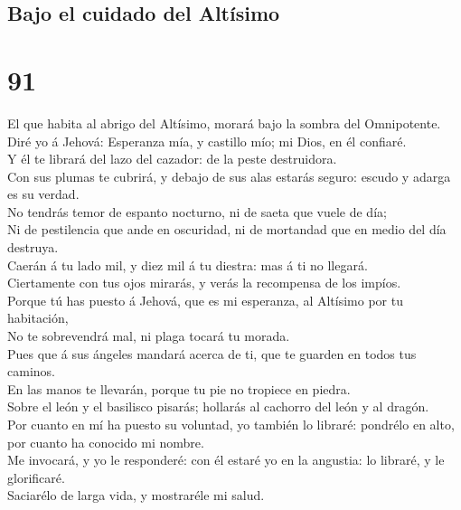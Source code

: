 \hypertarget{bajo-el-cuidado-del-altuxedsimo}{%
\subsection{Bajo el cuidado del
Altísimo}\label{bajo-el-cuidado-del-altuxedsimo}}

\hypertarget{section-90}{%
\section{91}\label{section-90}}

 El que habita al abrigo del Altísimo, morará bajo la
sombra del Omnipotente.\\
 Diré yo á Jehová: Esperanza mía, y castillo mío; mi Dios,
en él confiaré.\\
 Y él te librará del lazo del cazador: de la peste
destruidora.\\
 Con sus plumas te cubrirá, y debajo de sus alas estarás
seguro: escudo y adarga es su verdad.\\
 No tendrás temor de espanto nocturno, ni de saeta que
vuele de día;\\
 Ni de pestilencia que ande en oscuridad, ni de mortandad
que en medio del día destruya.\\
 Caerán á tu lado mil, y diez mil á tu diestra: mas á ti
no llegará.\\
 Ciertamente con tus ojos mirarás, y verás la recompensa
de los impíos.\\
 Porque tú has puesto á Jehová, que es mi esperanza, al
Altísimo por tu habitación,\\
 No te sobrevendrá mal, ni plaga tocará tu morada.\\
 Pues que á sus ángeles mandará acerca de ti, que te
guarden en todos tus caminos.\\
 En las manos te llevarán, porque tu pie no tropiece en
piedra.\\
 Sobre el león y el basilisco pisarás; hollarás al
cachorro del león y al dragón.\\
 Por cuanto en mí ha puesto su voluntad, yo también lo
libraré: pondrélo en alto, por cuanto ha conocido mi nombre.\\
 Me invocará, y yo le responderé: con él estaré yo en la
angustia: lo libraré, y le glorificaré.\\
 Saciarélo de larga vida, y mostraréle mi salud.

